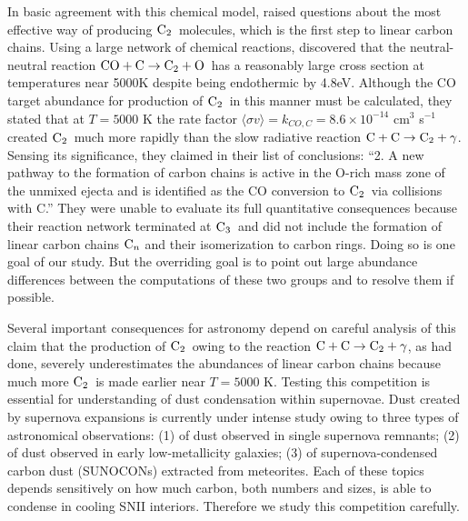 \documentclass[manuscript]{aastex}
\newcommand{\ctwo}{{\rm C}_2}
\newcommand{\cthree}{{\rm C}_3}
\newcommand{\cenn}{{\rm C}_n}
\newcommand{\twoctoctwo}{${\rm C} + {\rm C} \to \ctwo + \gamma$}
\newcommand{\coctoctwo}{${\rm CO} + {\rm C} \to \ctwo + {\rm O}$}
\begin{document}
In basic agreement with this chemical model, \citet{2009ApJ...703..642C} raised
questions about the most effective way of producing $\ctwo$\ molecules,
which is the
first step to linear carbon chains. Using a large network of chemical
reactions, \citet{2009ApJ...703..642C} discovered that the neutral-neutral
reaction \coctoctwo\
has a reasonably large cross section at temperatures near
5000K despite being endothermic by 4.8eV. Although the CO target abundance for
production of $\ctwo$\ in this manner must be calculated, they stated that at
$T=5000$ K the rate factor
$\langle \sigma v \rangle = k_{CO,C} = 8.6 \times 10^{-14}$ cm$^3$ s$^{-1}$
created $\ctwo$\ much more
rapidly than the slow radiative reaction \twoctoctwo.
Sensing its significance,
they claimed in their list of conclusions: ``2. A new pathway to the formation
of carbon chains is active in the O-rich mass zone of the unmixed ejecta and
is identified as the CO conversion to $\ctwo$\ via collisions with C.''  They were
unable to evaluate its full quantitative consequences because their reaction
network terminated at $\cthree$\
and did not include the formation of linear carbon
chains $\cenn$
and their isomerization to carbon rings. Doing so is one goal of our
study. But the overriding goal is to point out large abundance differences
between the computations of these two groups and to resolve them if possible. 

Several important consequences for astronomy depend on careful
analysis of this claim that the production of $\ctwo$\ owing to the reaction
\twoctoctwo, as \citet{1999Sci...283.1290C,2001ApJ...562..480C}
had done, severely
underestimates the abundances of linear carbon chains because much more $\ctwo$\
is made earlier \citep{2010ApJ...713....1C} near $T = 5000$ K. Testing this
competition is essential for understanding of dust condensation within
supernovae. Dust created by supernova expansions is currently under intense
study owing to three types of astronomical observations: (1) of dust observed
in single supernova remnants; (2) of dust observed in early low-metallicity
galaxies; (3) of supernova-condensed carbon dust (SUNOCONs) extracted from
meteorites. Each of these topics depends sensitively on how much carbon,
both numbers and sizes, is able to condense in cooling SNII interiors.
Therefore we study this competition carefully.
\end{document}
